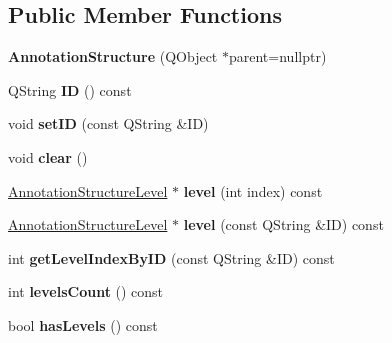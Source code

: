 \subsection*{Public Member Functions}
\begin{DoxyCompactItemize}
\item 
\mbox{\label{class_annotation_structure_a699e5000e1bebadabe29a190061cbab1}} 
{\bfseries Annotation\+Structure} (Q\+Object $\ast$parent=nullptr)
\item 
\mbox{\label{class_annotation_structure_adee363d0ab8c4a24faac0baae7ce1255}} 
Q\+String {\bfseries ID} () const
\item 
\mbox{\label{class_annotation_structure_aa8ca4d1a4561d59ea547e6bb0affd13e}} 
void {\bfseries set\+ID} (const Q\+String \&ID)
\item 
\mbox{\label{class_annotation_structure_a01e3f5cd86558b0bee1b9ffe417179e8}} 
void {\bfseries clear} ()
\item 
\mbox{\label{class_annotation_structure_a73f138540af019a68e2c0f09b9b7222a}} 
\hyperlink{class_annotation_structure_level}{Annotation\+Structure\+Level} $\ast$ {\bfseries level} (int index) const
\item 
\mbox{\label{class_annotation_structure_a39c00c91a24f2fd1a3ec2b431fc0e72c}} 
\hyperlink{class_annotation_structure_level}{Annotation\+Structure\+Level} $\ast$ {\bfseries level} (const Q\+String \&ID) const
\item 
\mbox{\label{class_annotation_structure_a84aad44d6c79068731a74cf9b2378297}} 
int {\bfseries get\+Level\+Index\+By\+ID} (const Q\+String \&ID) const
\item 
\mbox{\label{class_annotation_structure_a6d13b4ea9594708a38493f7a84378568}} 
int {\bfseries levels\+Count} () const
\item 
\mbox{\label{class_annotation_structure_a8cf4b14407a39d34b5b7eb790a991183}} 
bool {\bfseries has\+Levels} () const

\end{DoxyCompactItemize}
